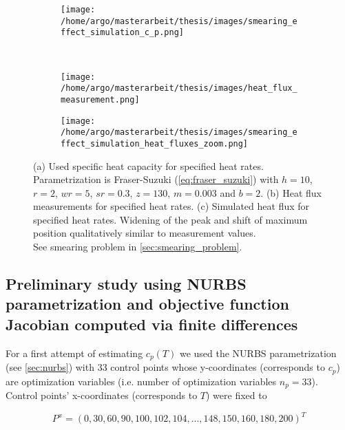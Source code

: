 \documentclass{scrartcl}[12pt, halfparskip]
\numberwithin{equation}{section}
\numberwithin{figure}{section}
\numberwithin{table}{section}
\begin{document}
\begin{figure}[H]
	\centering
	\begin{subfigure}{0.9\textwidth}
		\centering
		\texttt{[image: /home/argo/masterarbeit/thesis/images/smearing\_effect\_simulation\_c\_p.png]}
		\caption{}
		\label{fig:smearing_effect_c_p}
	\end{subfigure} \\
	\begin{subfigure}{0.49\textwidth}
		\texttt{[image: /home/argo/masterarbeit/thesis/images/heat\_flux\_measurement.png]}
		\caption{}
		\label{fig:smearing_effect_measurement_heat_flux}
	\end{subfigure}
	\begin{subfigure}{0.49\textwidth}
		\texttt{[image: /home/argo/masterarbeit/thesis/images/smearing\_effect\_simulation\_heat\_fluxes\_zoom.png]}
		\caption{}
		\label{fig:smearing_effect_simulation_heat_flux}
	\end{subfigure}
	\caption{(a) Used specific heat capacity for specified heat rates. Parametrization is Fraser-Suzuki (\cref{eq:fraser_suzuki}) with $h=10$, $r=2$, $wr=5$, $sr=0.3$, $z=130$, $m=0.003$ and $b=2$. (b) Heat flux measurements for specified heat rates. (c) Simulated heat flux for specified heat rates. Widening of the peak and shift of maximum position qualitatively similar to measurement values. \\
	See smearing problem in \cref{sec:smearing_problem}.}
\end{figure}



\subsection{Preliminary study using NURBS parametrization and objective function Jacobian computed via finite differences}
\label{sec:param_estim_NURBS}

For a first attempt of estimating $c_p(T)$  we used the NURBS parametrization (see \cref{sec:nurbs}) with 33 control points whose y-coordinates (corresponds to $c_p$) are optimization variables (i.e. number of optimization variables $n_p=33$). Control points' x-coordinates (corresponds to $T$) were fixed to 

\begin{equation}
	P^x = (0, 30, 60, 90, 100, 102, 104, ..., 148, 150, 160, 180, 200)^T
\end{equation}
\end{document}
